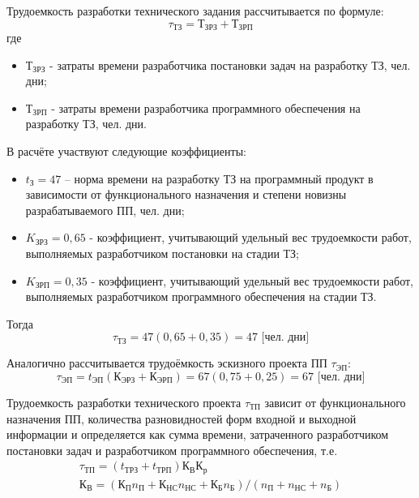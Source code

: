 \documentclass[a4paper,12pt]{report}
\numberwithin{equation}{section}
\begin{document}
Трудоемкость разработки технического задания рассчитывается по формуле:
\begin{equation}
	\tau_{ТЗ} = Т_{ЗРЗ} + Т_{ЗРП}
\end{equation}
где 
\begin{itemize}
  \item $Т_{ЗРЗ}$ - затраты времени разработчика постановки задач на разработку ТЗ, чел. дни;
  \item $Т_{ЗРП}$ - затраты времени разработчика программного обеспечения на разработку ТЗ, чел. дни.
\end{itemize}

В расчёте участвуют следующие коэффициенты:
\begin{itemize}
  \item $t_З = 47$ – норма времени на разработку ТЗ на программный продукт в зависимости от функционального назначения и степени новизны разрабатываемого ПП, чел. дни;
  \item $K_{ЗРЗ} = 0,65$ - коэффициент, учитывающий удельный вес трудоемкости работ, выполняемых разработчиком постановки на стадии ТЗ;
  \item $K_{ЗРП} = 0,35$ - коэффициент, учитывающий удельный вес трудоемкости работ, выполняемых разработчиком программного обеспечения на стадии ТЗ.
\end{itemize}

Тогда
\begin{equation}
	\tau_{ТЗ} = 47 (0,65 + 0,35) = 47 \text{ [чел. дни]}
\end{equation}

Аналогично рассчитывается трудоёмкость эскизного проекта ПП $\tau_{ЭП}$:
\begin{equation}
	\tau_{ЭП} = t_{ЭП} (К_{ЭРЗ} + К_{ЭРП}) = 67 (0,75 + 0,25) = 67 \text{ [чел. дни]}
\end{equation}

Трудоемкость разработки технического проекта $\tau_{ТП}$ зависит от функционального назначения ПП, количества разновидностей форм входной и выходной информации и определяется как сумма времени, затраченного разработчиком постановки задач и разработчиком программного обеспечения, т.е.
\begin{gather*}
	\tau_{ТП} = (t_{ТРЗ} + t_{ТРП}) К_В К_р \\
	К_В = (К_П n_П + К_{НС} n_{НС} + К_Б n_Б) / (n_П + n_{НС} + n_Б)
\end{gather*}
\end{document}
